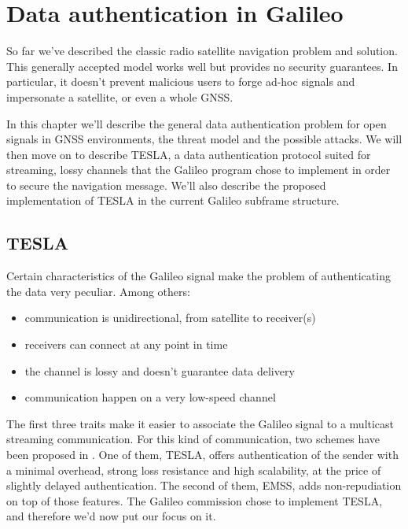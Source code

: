 
\chapter{Data authentication in Galileo}
\label{ch:data_auth}

So far we've described the classic radio satellite navigation problem and
solution. This generally accepted model works well but provides no security
guarantees. In particular, it doesn't prevent malicious users to forge ad-hoc
signals and impersonate a satellite, or even a whole GNSS.

In this chapter we'll describe the general data authentication problem for open
signals in GNSS environments, the threat model and the possible attacks. We will
then move on to describe TESLA, a data authentication protocol suited for
streaming, lossy channels that the Galileo program chose to implement in order
to secure the navigation message. We'll also describe the proposed
implementation of TESLA in the current Galileo subframe structure.

\section{TESLA}
Certain characteristics of the Galileo signal make the problem of authenticating
the data very peculiar. Among others:
\begin{itemize}
  \item communication is unidirectional, from satellite to receiver(s)
  \item receivers can connect at any point in time
  \item the channel is lossy and doesn't guarantee data delivery
  \item communication happen on a very low-speed channel
\end{itemize}
The first three traits make it easier to associate the Galileo signal to a
multicast streaming communication. For this kind of communication, two schemes
have been proposed in \cite{perrig}. One of them, TESLA, offers authentication
of the sender with a minimal overhead, strong loss resistance and high
scalability, at the price of slightly delayed authentication. The second of
them, EMSS, adds non-repudiation on top of those features. The Galileo
commission chose to implement TESLA, and therefore we'd now put our focus on it.

\par


